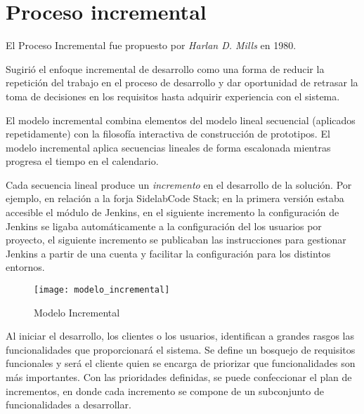 
\section{Proceso incremental}
\label{sec:proc-incremental}

\par El Proceso Incremental fue propuesto por \emph{Harlan D. Mills} en 1980.

\par Sugirió el enfoque incremental de desarrollo como una forma de reducir la repetición del trabajo en el proceso de desarrollo y dar oportunidad de retrasar la toma de decisiones en los requisitos hasta adquirir experiencia con el sistema.

\par El modelo incremental combina elementos del modelo lineal secuencial (aplicados repetidamente) con la filosofía interactiva de construcción de prototipos. El modelo incremental aplica secuencias lineales de forma escalonada mientras progresa el tiempo en el calendario.

\par Cada secuencia lineal produce un \emph{incremento} en el desarrollo de la solución. Por ejemplo, en relación a la forja SidelabCode Stack; en la primera versión estaba accesible el módulo de Jenkins, en el siguiente incremento la configuración de Jenkins se ligaba automáticamente a la configuración del los usuarios por proyecto, el siguiente incremento se publicaban las instrucciones para gestionar Jenkins a partir de una cuenta y facilitar la configuración para los distintos entornos.

\begin{figure}[H]
    \centering
    \texttt{[image: modelo\_incremental]}
    \caption{Modelo Incremental}
    \label{fig:modelo-incremental}
\end{figure}

\par Al iniciar el desarrollo, los clientes o los usuarios, identifican a grandes rasgos las funcionalidades que proporcionará el sistema. Se define un bosquejo de requisitos funcionales y será el cliente quien se encarga de priorizar que funcionalidades son más importantes. Con las prioridades definidas, se puede confeccionar el plan de incrementos, en donde cada incremento se compone de un subconjunto de funcionalidades a desarrollar.


